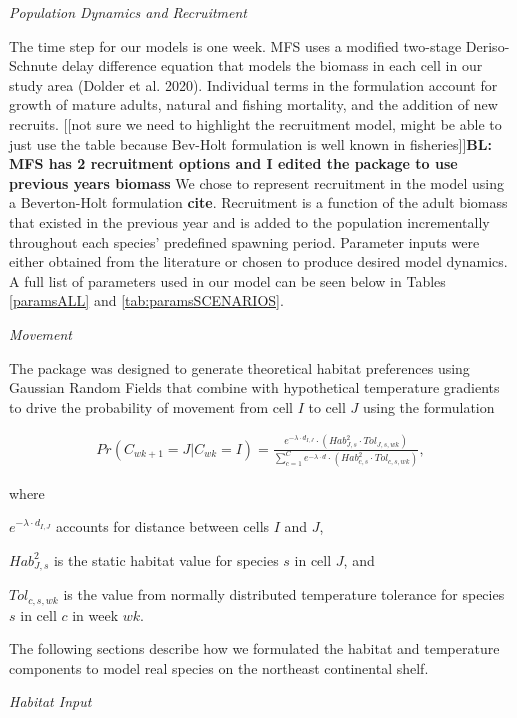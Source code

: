 \documentclass[
  12pt,
]{article}
\begin{document}
\emph{Population Dynamics and Recruitment}

The time step for our models is one week. MFS uses a modified two-stage Deriso-Schnute delay difference equation that models the biomass in each cell in our study area (Dolder et al. 2020). Individual terms in the formulation account for growth of mature adults, natural and fishing mortality, and the addition of new recruits. {[}{[}not sure we need to highlight the recruitment model, might be able to just use the table because Bev-Holt formulation is well known in fisheries{]}{]}\textbf{BL: MFS has 2 recruitment options and I edited the package to use previous years biomass} We chose to represent recruitment in the model using a Beverton-Holt formulation \textbf{cite}. Recruitment is a function of the adult biomass that existed in the previous year and is added to the population incrementally throughout each species' predefined spawning period. Parameter inputs were either obtained from the literature or chosen to produce desired model dynamics. A full list of parameters used in our model can be seen below in Tables \ref{paramsALL} and \ref{tab:paramsSCENARIOS}.

\emph{Movement}

The package was designed to generate theoretical habitat preferences using Gaussian Random Fields that combine with hypothetical temperature gradients to drive the probability of movement from cell \(I\) to cell \(J\) using the formulation

\begin{align}
Pr(C_{wk+1}=J|C_{wk}=I) = \frac{e^{-\lambda \cdot d_{I,J}}\cdot(Hab^2_{J,s} \cdot Tol_{J,s,wk})}{\sum^C_{c=1}e^{-\lambda \cdot d} \cdot (Hab^2_{c,s} \cdot Tol_{c,s,wk})},
\label{moveP}
\end{align}

where

\(e^{-\lambda \cdot d_{I,J}}\) accounts for distance between cells \(I\) and \(J\),

\(Hab^2_{J,s}\) is the static habitat value for species \(s\) in cell \(J\), and

\(Tol_{c,s,wk}\) is the value from normally distributed temperature tolerance for species \(s\) in cell \(c\) in week \(wk\).

The following sections describe how we formulated the habitat and temperature components to model real species on the northeast continental shelf.

\emph{Habitat Input}
\end{document}
